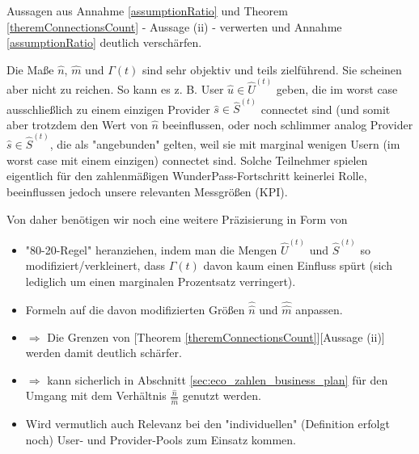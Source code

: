 \vspace{0.3cm}

Aussagen aus Annahme \ref{assumptionRatio} und Theorem \ref{theremConnectionsCount} - Aussage (ii) - verwerten und Annahme \ref{assumptionRatio} deutlich verschärfen.

\vspace{1cm}


\todo{[TODO4]["Sättigung"]}
\vspace{0.3cm}

Die Maße $\widehat{n}$, $\widehat{m}$ und $\Gamma(t)$ sind sehr objektiv und teils zielführend. Sie scheinen aber nicht zu reichen. So kann es z. B. User $\widehat{u} \in \widehat{U}^{(t)}$ geben, die im worst case ausschließlich zu einem einzigen Provider $\widehat{s} \in \widehat{S}^{(t)}$ connectet sind (und somit aber trotzdem den Wert von $\widehat{n}$ beeinflussen, oder noch schlimmer analog Provider $\widehat{s} \in \widehat{S}^{(t)}$, die als "angebunden" gelten, weil sie mit marginal wenigen Usern (im worst case mit einem einzigen) connectet sind. Solche Teilnehmer spielen eigentlich für den zahlenmäßigen WunderPass-Fortschritt keinerlei Rolle, beeinflussen jedoch unsere relevanten Messgrößen (KPI).

Von daher benötigen wir noch eine weitere Präzisierung in Form von

\begin{itemize}
  \item "80-20-Regel" heranziehen, indem man die Mengen $\widehat{U}^{(t)}$ und $\widehat{S}^{(t)}$ so modifiziert/verkleinert, dass $\Gamma(t)$ davon kaum einen Einfluss spürt (sich lediglich um einen marginalen Prozentsatz verringert).
  \item Formeln auf die davon modifizierten Größen $\widehat{\widehat{n}}$ und $\widehat{\widehat{m}}$ anpassen.
  \item $\Rightarrow$ Die Grenzen von [Theorem \ref{theremConnectionsCount}][Aussage (ii)] werden damit deutlich schärfer.
  \item $\Rightarrow$ kann sicherlich in Abschnitt \ref{sec:eco_zahlen_business_plan} für den Umgang mit dem Verhältnis $\frac{\widehat{n}}{\widehat{m}}$ genutzt werden.
  \item Wird vermutlich auch Relevanz bei den "individuellen" (Definition erfolgt noch) User- und Provider-Pools zum Einsatz kommen.
\end{itemize}

